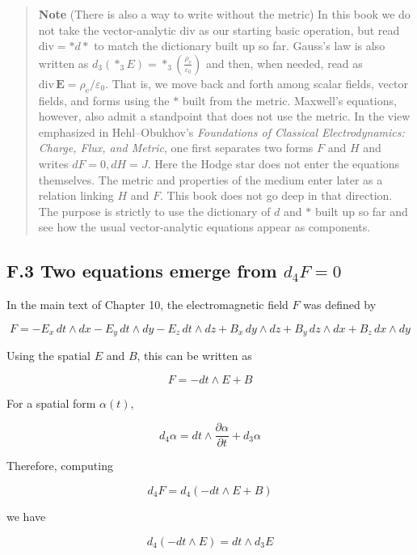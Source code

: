 \begin{quote}
\textbf{Note} (There is also a way to write without the metric) In this
book we do not take the vector-analytic \(\mathrm{div}\) as our starting
basic operation, but read \(\mathrm{div}=\ast d\ast\) to match the
dictionary built up so far. Gauss's law is also written as
\(d_3(\ast_3E) = \ast_3\left(\frac{\rho_{\mathrm e}}{\varepsilon_0}\right)\)
and then, when needed, read as
\(\mathrm{div}\,\mathbf E=\rho_{\mathrm e}/\varepsilon_0\). That is, we
move back and forth among scalar fields, vector fields, and forms using
the \(\ast\) built from the metric. Maxwell's equations, however, also
admit a standpoint that does not use the metric. In the view emphasized
in Hehl--Obukhov's \emph{Foundations of Classical Electrodynamics:
Charge, Flux, and Metric}, one first separates two forms \(F\) and \(H\)
and writes \(dF=0, dH=J\). Here the Hodge star does not enter the
equations themselves. The metric and properties of the medium enter
later as a relation linking \(H\) and \(F\). This book does not go deep
in that direction. The purpose is strictly to use the dictionary of
\(d\) and \(\ast\) built up so far and see how the usual vector-analytic
equations appear as components.
\end{quote}

\hypertarget{f.3-two-equations-emerge-from-d_4f0}{%
\subsection{\texorpdfstring{F.3 Two equations emerge from
\(d_4F=0\)}{F.3 Two equations emerge from d\_4F=0}}\label{f.3-two-equations-emerge-from-d_4f0}}

In the main text of Chapter 10, the electromagnetic field \(F\) was
defined by

\[
F=-E_x\,dt\wedge dx-E_y\,dt\wedge dy-E_z\,dt\wedge dz+B_x\,dy\wedge dz+B_y\,dz\wedge dx+B_z\,dx\wedge dy
\]

Using the spatial \(E\) and \(B\), this can be written as

\[
F=-dt\wedge E+B
\]

For a spatial form \(\alpha(t)\),

\[
d_4\alpha = dt\wedge\frac{\partial\alpha}{\partial t}+d_3\alpha
\]

Therefore, computing

\[
d_4F=d_4(-dt\wedge E+B)
\]

we have

\[
d_4(-dt\wedge E)=dt\wedge d_3E
\]

